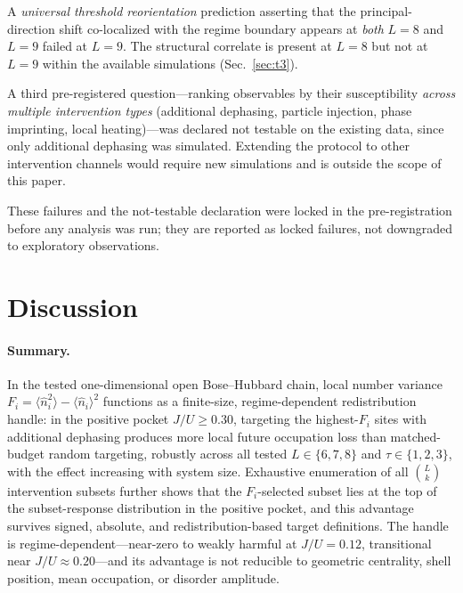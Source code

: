 \documentclass[aps,prresearch,reprint,amsmath,amssymb,longbibliography,floatfix]{revtex4-2}
\newcommand{\Fi}{F_i}
\newcommand{\nop}{\hat{n}}
\begin{document}
A \emph{universal threshold reorientation} prediction asserting that
the principal-direction shift co-localized with the regime boundary
appears at \emph{both} $L=8$ and $L=9$ failed at $L=9$.
The structural correlate is present at $L=8$ but not at $L=9$ within
the available simulations (Sec.~\ref{sec:t3}).

A third pre-registered question---ranking observables by their
susceptibility \emph{across multiple intervention types} (additional
dephasing, particle injection, phase imprinting, local heating)---was
declared not testable on the existing data, since only additional
dephasing was simulated.
Extending the protocol to other intervention channels would require new
simulations and is outside the scope of this paper.

These failures and the not-testable declaration were locked in the
pre-registration before any analysis was run; they are reported as
locked failures, not downgraded to exploratory observations.

\section{Discussion}
\label{sec:disc}

\paragraph*{Summary.}
In the tested one-dimensional open Bose--Hubbard chain, local number
variance $\Fi = \langle\nop_i^2\rangle - \langle\nop_i\rangle^2$
functions as a finite-size, regime-dependent redistribution handle:
in the positive pocket $J/U\geq0.30$, targeting the highest-$\Fi$ sites
with additional dephasing produces more local future occupation loss than
matched-budget random targeting, robustly across all tested $L\in\{6,7,8\}$
and $\tau\in\{1,2,3\}$, with the effect increasing with system size.
Exhaustive enumeration of all $\binom{L}{k}$ intervention subsets
further shows that the $\Fi$-selected subset lies at the top of the
subset-response distribution in the positive pocket, and this advantage
survives signed, absolute, and redistribution-based target definitions.
The handle is regime-dependent---near-zero to weakly harmful at $J/U=0.12$,
transitional near $J/U\approx0.20$---and its advantage is not reducible to
geometric centrality, shell position, mean occupation, or disorder amplitude.
\end{document}
